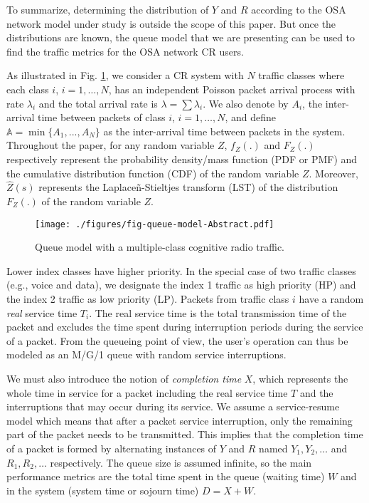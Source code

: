 \documentclass[11pt,journal,oneside,onecolumn,draftclsnofoot]{IEEEtran}
\begin{document}
To summarize, determining the distribution of $Y$ and $R$ according to the OSA network model under study is outside the scope of this paper. But once the distributions are known, the queue model that we are presenting can be used to find the traffic metrics for the OSA network CR users.
 

As illustrated in Fig. \ref{fig-queue-model-Abstract}, we consider a CR system with $N$ traffic classes where each class $i$, $i=1,\dots,N$, has an independent Poisson packet arrival process with rate $\lambda_i$ and the total arrival rate is $\lambda=\sum\lambda_i$. We also denote by $A_i$, the inter-arrival time between packets of class $i$, $i=1,\dots,N$, and define $\mathbb{A} = \min \{ A_1,...,A_{N} \}$ as the inter-arrival time between packets in the system. Throughout the paper, for any random variable $Z$, $f_Z(.)$ and $F_Z(.)$ respectively represent the probability density/mass function (PDF or PMF) and the cumulative distribution function (CDF) of the random variable $Z$. Moreover, $\widehat{Z}(s)$ represents the {Laplaceñ-Stieltjes} transform (LST) of the distribution $F_Z(.)$ of the random variable $Z$. 
\begin{figure}\texttt{[image: ./figures/fig-queue-model-Abstract.pdf]}\caption{Queue model with a multiple-class cognitive radio traffic.}\label{fig-queue-model-Abstract}\end{figure}

Lower index classes have higher priority. In the special case of two traffic classes (e.g., voice and data), we designate the index 1 traffic as high priority (HP) and the index 2 traffic as low priority (LP). Packets from traffic class $i$ have a random \emph{real} service time $T_i$. The real service time is the total transmission time of the packet and excludes the time spent during interruption periods during the service of a packet. From the queueing point of view, the user's operation can thus be modeled as an M/G/1 queue with random service interruptions. 

We must also introduce the notion of \emph{completion time} $X$, which represents the whole time in service for a packet including the real service time $T$ and the interruptions that may occur during its service. We assume a service-resume model which means that after a packet service interruption, only the remaining part of the packet needs to be transmitted. This implies that the completion time of a packet is formed by alternating instances of $Y$ and $R$ named $Y_1, Y_2,\dots$ and $R_1, R_2,\dots$ respectively. 
The queue size is assumed infinite, so the main performance metrics are the total time spent in the queue (waiting time) $W$ and in the system (system time or sojourn time) $D=X+W$. 
\end{document}
